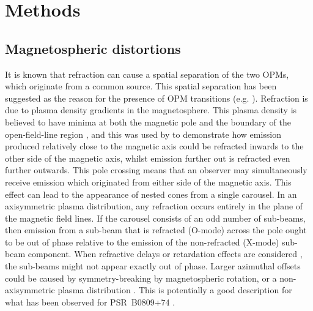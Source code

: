 



\section{Methods}
\label{sec: B0031 - methods}

\subsection{Magnetospheric distortions}
\label{sec: B0031 - methods - magnetospheric distortions}

It is known \citep[e.g.][]{ABxx1986,BAxx1986,Pxxx2000} that refraction can cause a spatial separation of the two OPMs, which originate from a common source. This spatial separation has been suggested as the reason for the presence of OPM transitions (e.g. \citealt{ESLx2003,ESxx2004}). Refraction is due to plasma density gradients in the magnetosphere. This plasma density is believed to have minima at both the magnetic pole and the boundary of the open-field-line region \citep[e.g.][]{LPxx1998}, and this was used by \citet{PLxx2000} to demonstrate how emission produced relatively close to the magnetic axis could be refracted inwards to the other side of the magnetic axis, whilst emission further out is refracted even further outwards. This pole crossing means that an observer may simultaneously receive emission which originated from either side of the magnetic axis. This effect can lead to the appearance of nested cones from a single carousel. In an axisymmetric plasma distribution, any refraction occurs entirely in the plane of the magnetic field lines. If the carousel consists of an odd number of sub-beams, then emission from a sub-beam that is refracted (O-mode) across the pole ought to be out of phase relative to the emission of the non-refracted (X-mode) sub-beam component. When refractive delays or retardation effects are considered \citep{ESLx2003}, the sub-beams might not appear exactly out of phase. Larger azimuthal offsets could be caused by symmetry-breaking by magnetospheric rotation, or a non-axisymmetric plasma distribution \citep{BCWx1991, PLxx2000}. This is potentially a good description for what has been observed for PSR~B0809+74 \citep{RRL+2006}.

